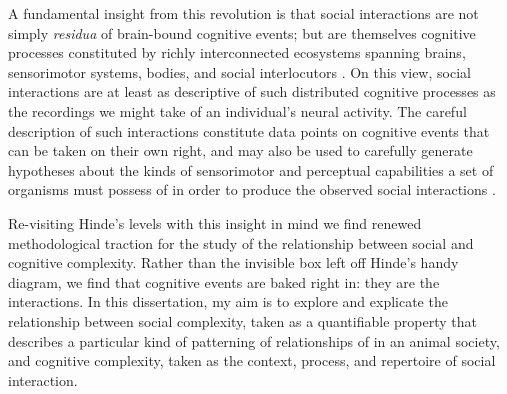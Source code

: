 \documentclass[11pt]{amsart}
\begin{document}
A fundamental insight from this revolution is that social interactions are not simply \textit{residua} of brain-bound cognitive events; but are themselves cognitive processes constituted by richly interconnected ecosystems spanning brains, sensorimotor systems, bodies, and social interlocutors \citep{hutchins:1995b,hutchins:2006}. On this view, social interactions are at least as descriptive of such distributed cognitive processes as the recordings we might take of an individual's neural activity. The careful description of such interactions constitute data points on cognitive events that can be taken on their own right, and may also be used to carefully generate hypotheses about the kinds of sensorimotor and perceptual capabilities a set of organisms must possess of in order to produce the observed social interactions \citep{byrne:2001, johnson:2001, johnson:2001b, king:2003, forster:2006, forster:2012}. 

Re-visiting Hinde's levels with this insight in mind we find renewed methodological traction for the study of the relationship between social and cognitive complexity. Rather than the invisible box left off Hinde's handy diagram, we find that cognitive events are baked right in: they are the interactions. In this dissertation, my aim is to explore and explicate the relationship between social complexity, taken as a quantifiable property that describes a particular kind of patterning of relationships of in an animal society, and cognitive complexity, taken as the context, process, and repertoire of social interaction. 

\end{document}
